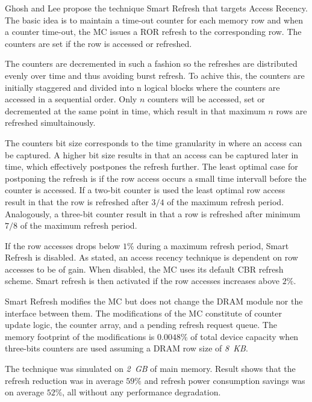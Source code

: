 Ghosh and Lee propose the technique Smart Refresh \cite{smartrefresh} that targets Access Recency. The basic idea is to maintain a time-out counter for each memory row and when a counter time-out, the MC issues a ROR refresh to the corresponding row. The counters are set if the row is accessed or refreshed.

The counters are decremented in such a fashion so the refreshes are distributed evenly over time and thus avoiding burst refresh. To achive this, the counters are initially staggered and divided into n logical blocks where the counters are accessed in a sequential order. Only $n$ counters will be accessed, set or decremented at the same point in time, which result in that maximum $n$ rows are refreshed simultainously. 

The counters bit size corresponds to the time granularity in where an access can be captured. A higher bit size results in that an access can be captured later in time, which effectively postpones the refresh further. The least optimal case for postponing the refresh is if the row access occurs a small time intervall before the counter is accessed. If a two-bit counter is used the least optimal row access result in that the row is refreshed after $3/4$ of the maximum refresh period. Analogously, a three-bit counter result in that a row is refreshed after minimum $7/8$ of the maximum refresh period.

If the row accesses drops below $1\%$ during a maximum refresh period, Smart Refresh is disabled. As stated, an access recency technique is dependent on row accesses to be of gain. When disabled, the MC uses its default CBR refresh scheme. Smart refresh is then activated if the row accesses increases above $2\%$.

Smart Refresh modifies the MC but does not change the DRAM module nor the interface between them. The modifications of the MC constitute of counter update logic, the counter array, and a pending refresh request queue. The memory footprint of the modifications is $0.0048\%$ of total device capacity when three-bits counters are used assuming a DRAM row size of \textit{8~KB}.

The technique was simulated on \textit{2~GB} of main memory. Result shows that the refresh reduction was in average $59\%$ and refresh power consumption savings was on average $52\%$, all without any performance degradation.